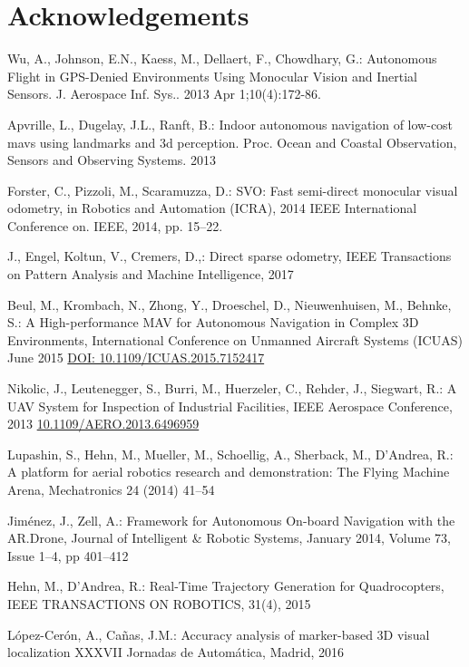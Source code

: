 \documentclass{styles/svproc}
\begin{document}
        \section*{Acknowledgements}
%
%
\begin{thebibliography}{6}
Wu, A., Johnson, E.N., Kaess, M., Dellaert, F., Chowdhary, G.: Autonomous Flight in GPS-Denied Environments Using Monocular Vision and Inertial Sensors. J. Aerospace Inf. Sys.. 2013 Apr 1;10(4):172-86.

Apvrille, L., Dugelay, J.L., Ranft, B.: Indoor autonomous navigation of low-cost mavs using landmarks and 3d perception. Proc. Ocean and Coastal Observation, Sensors and Observing Systems. 2013 

Forster, C., Pizzoli, M., Scaramuzza, D.: SVO: Fast semi-direct monocular visual odometry, in Robotics and Automation (ICRA), 2014
IEEE International Conference on. IEEE, 2014, pp. 15–22.

J., Engel, Koltun, V., Cremers, D.,: Direct sparse odometry, IEEE Transactions on Pattern Analysis and Machine Intelligence, 2017

Beul, M., Krombach, N., Zhong, Y., Droeschel, D., Nieuwenhuisen, M., Behnke, S.: A High-performance MAV for Autonomous Navigation in Complex 3D Environments, International Conference on Unmanned Aircraft Systems (ICUAS) June 2015 \url{DOI: 10.1109/ICUAS.2015.7152417}

Nikolic, J., Leutenegger, S., Burri, M., Huerzeler, C., Rehder, J., Siegwart, R.: A UAV System for Inspection of Industrial Facilities, IEEE Aerospace Conference, 2013 \url{10.1109/AERO.2013.6496959}

Lupashin, S., Hehn, M., Mueller, M., Schoellig, A., Sherback, M., D’Andrea, R.: A platform for aerial robotics research and demonstration: The Flying Machine Arena, Mechatronics 24 (2014) 41–54

Jiménez, J., Zell, A.: Framework for Autonomous On-board Navigation with the AR.Drone, Journal of Intelligent \& Robotic Systems, January 2014, Volume 73, Issue 1–4, pp 401–412

Hehn, M., D'Andrea, R.: Real-Time Trajectory Generation for Quadrocopters, IEEE TRANSACTIONS ON ROBOTICS,  31(4), 2015

López-Cerón, A., Cañas, J.M.: Accuracy analysis of marker-based 3D visual localization
 XXXVII Jornadas de Automática, Madrid, 2016 %


\end{thebibliography}

        
\end{document}
